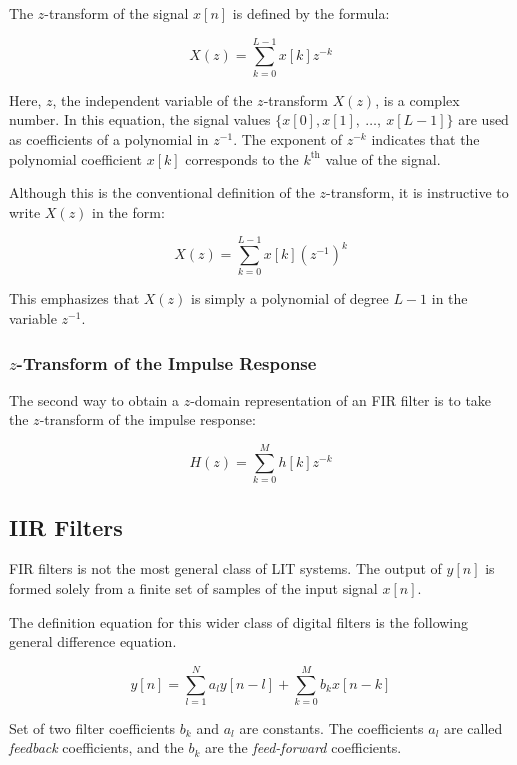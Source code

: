 \documentclass[11pt]{article}
\begin{document}
The $z$-transform of the signal $x[n]$ is defined by the formula:

\begin{equation}
  X(z) = \sum_{k = 0}^{L - 1} x[k]z^{-k}
\end{equation}

Here, $z$, the independent variable of the $z$-transform $X(z)$, is a complex
number. In this equation, the signal values $\{x[0], x[1],\ \dots,\ x[L - 1]\}$
are used as coefficients of a polynomial in $z^{-1}$. The exponent of $z^{-k}$
indicates that the polynomial coefficient $x[k]$ corresponds to the
$k^{\text{th}}$ value of the signal.

Although this is the conventional definition of the $z$-transform, it is
instructive to write $X(z)$ in the form:

\begin{equation}
  X(z) = \sum_{k = 0}^{L - 1} x[k](z^{-1})^{k}
\end{equation}

This emphasizes that $X(z)$ is simply a polynomial of degree $L - 1$ in the
variable $z^{-1}$.

\subsubsection{$z$-Transform of the Impulse Response}

The second way to obtain a $z$-domain representation of an FIR filter is to take
the $z$-transform of the impulse response:

\begin{equation}
  H(z) = \sum_{k = 0}^{M} h[k]z^{-k}
\end{equation}

\subsection{IIR Filters}

FIR filters is not the most general class of LIT systems. The output of $y[n]$
is formed solely from a finite set of samples of the input signal $x[n]$.

The definition equation for this wider class of digital filters is the following
general difference equation.

\begin{equation}
  y[n] = \sum_{l = 1}^{N}a_ly[n - l] + \sum_{k = 0}^{M}b_kx[n - k]
\end{equation}

Set of two filter coefficients ${b_k}$ and $a_l$ are constants. The coefficients
${a_l}$ are called \textit{feedback} coefficients, and the ${b_k}$ are the
\textit{feed-forward} coefficients.

\newpage
\printbibliography
\end{document}
